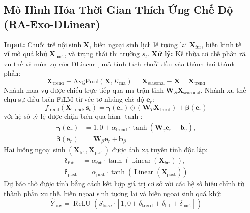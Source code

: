 \documentclass[10pt,journal,compsoc]{IEEEtran}
\begin{document}
\subsection{Mô Hình Hóa Thời Gian Thích Ứng Chế Độ (RA-Exo-DLinear)}
\noindent \textbf{Input:} Chuỗi trễ nội sinh $\mathbf{X}$, biến ngoại sinh lịch lễ tương lai $\mathbf{X}_{\text{fut}}$, biến kinh tế vĩ mô quá khứ $\mathbf{X}_{\text{past}}$, và trạng thái thị trường $s_t$.
\noindent \textbf{Xử lý:} Kế thừa cơ chế phân rã xu thế và mùa vụ của DLinear \cite{zeng2023dlinear}, mô hình tách chuỗi đầu vào thành hai thành phần:
\begin{equation}
\mathbf{X}_{\text{trend}} = \text{AvgPool}(\mathbf{X}, K_{\text{ma}}), \quad \mathbf{X}_{\text{seasonal}} = \mathbf{X} - \mathbf{X}_{\text{trend}}
\end{equation}
Nhánh mùa vụ được chiếu trực tiếp qua ma trận tĩnh $\mathbf{W}_S \mathbf{X}_{\text{seasonal}}$. Nhánh xu thế chịu sự điều biến FiLM \cite{perez2018film} từ véc-tơ nhúng chế độ $\mathbf{e}_r$:
\begin{equation}
f_{\text{trend}}(\mathbf{X}_{\text{trend}}, \mathbf{s}_t) = \boldsymbol{\gamma}(\mathbf{e}_r) \odot (\mathbf{W}_T \mathbf{X}_{\text{trend}}) + \boldsymbol{\beta}(\mathbf{e}_r)
\end{equation}
với hệ số tỷ lệ được chặn biên qua hàm $\tanh$:
\begin{equation}
\begin{aligned}
\boldsymbol{\gamma}(\mathbf{e}_r) &= 1,0 + \alpha_{\text{trend}} \cdot \tanh(\mathbf{W}_\gamma \mathbf{e}_r + \mathbf{b}_\gamma), \\
\boldsymbol{\beta}(\mathbf{e}_r) &= \mathbf{W}_\beta \mathbf{e}_r + \mathbf{b}_\beta
\end{aligned}
\end{equation}
Hai luồng ngoại sinh $(\mathbf{X}_{\text{fut}}, \mathbf{X}_{\text{past}})$ được ánh xạ tuyến tính độc lập:
\begin{equation}
\begin{aligned}
\boldsymbol{\delta}_{\text{fut}} &= \alpha_{\text{fut}} \cdot \tanh(\operatorname{Linear}(\mathbf{X}_{\text{fut}})), \\
\boldsymbol{\delta}_{\text{past}} &= \alpha_{\text{past}} \cdot \tanh(\operatorname{Linear}(\mathbf{X}_{\text{past}}))
\end{aligned}
\end{equation}
Dự báo thô được tính bằng cách kết hợp giá trị cơ sở với các hệ số hiệu chỉnh từ thành phần xu thế, biến ngoại sinh tương lai và biến ngoại sinh quá khứ:
\begin{equation}
\hat{Y}_{\text{raw}} = \operatorname{ReLU}\left(S_{\text{base}} \cdot \left[1,0 + \delta_{\text{trend}} + \delta_{\text{fut}} + \delta_{\text{past}}\right]\right)
\end{equation}
\end{document}
